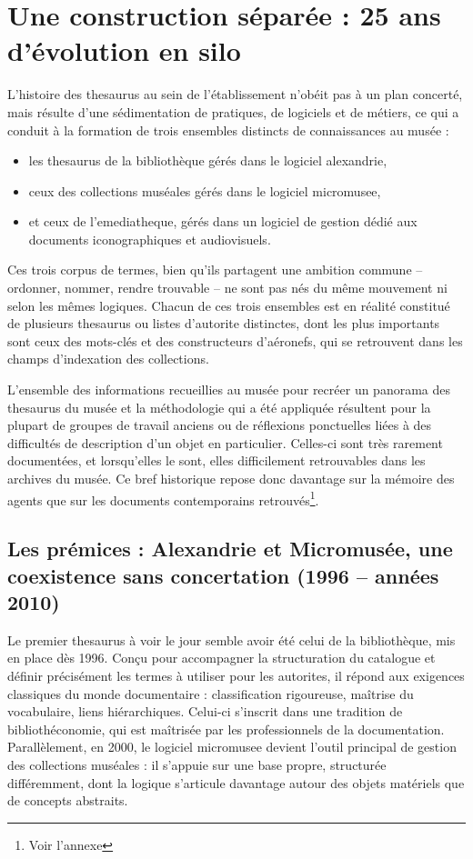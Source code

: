 \section{\label{II-A-1}Une construction séparée : 25 ans d'évolution en silo}

L'histoire des \gls{thesaurus} au sein de l'établissement n'obéit pas à un plan concerté, mais résulte d'une sédimentation de pratiques, de logiciels et de métiers, ce qui a conduit à la formation de trois ensembles distincts de connaissances au musée : 
\begin{itemize}
	\item les \gls{thesaurus} de la bibliothèque gérés dans le logiciel \gls{alexandrie},
	\item ceux des collections muséales gérés dans le logiciel \gls{micromusee},
	\item et ceux de l'\gls{emediatheque}, gérés dans un logiciel de gestion dédié aux documents iconographiques et audiovisuels.
\end{itemize}
Ces trois corpus de termes, bien qu'ils partagent une ambition commune – ordonner, nommer, rendre trouvable – ne sont pas nés du même mouvement ni selon les mêmes logiques. Chacun de ces trois ensembles est en réalité constitué de plusieurs \gls{thesaurus} ou listes d'\gls{autorite} distinctes, dont les plus importants sont ceux des mots-clés et des constructeurs d'aéronefs, qui se retrouvent dans les champs d'indexation des collections.

L'ensemble des informations recueillies au musée pour recréer un panorama des \gls{thesaurus} du musée et la méthodologie qui a été appliquée résultent pour la plupart de groupes de travail anciens ou de réflexions ponctuelles liées à des difficultés de description d'un objet en particulier. Celles-ci sont très rarement documentées, et lorsqu'elles le sont, elles difficilement retrouvables dans les archives du musée. Ce bref historique repose donc davantage sur la mémoire des agents que sur les documents contemporains retrouvés\footnote{Voir l'annexe }.

\subsection{Les prémices : Alexandrie et Micromusée, une coexistence sans concertation (1996 – années 2010)}

Le premier \gls{thesaurus} à voir le jour semble avoir été celui de la bibliothèque, mis en place dès 1996. Conçu pour accompagner la structuration du catalogue et définir précisément les termes à utiliser pour les \glspl{autorite}, il répond aux exigences classiques du monde documentaire : classification rigoureuse, maîtrise du vocabulaire, liens hiérarchiques. Celui-ci s'inscrit dans une tradition de bibliothéconomie, qui est maîtrisée par les professionnels de la documentation. Parallèlement, en 2000, le logiciel \gls{micromusee} devient l'outil principal de gestion des collections muséales : il s'appuie sur une base propre, structurée différemment, dont la logique s'articule davantage autour des objets matériels que de concepts abstraits.

